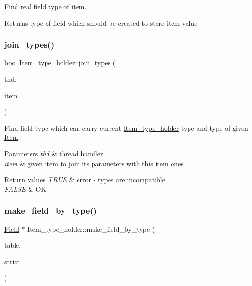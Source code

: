 Find real field type of item.

\begin{DoxyReturn}{Returns}
type of field which should be created to store item value 
\end{DoxyReturn}
\mbox{\label{classItem__type__holder_a7c3826305012a52cf704d39513e945b1}} 
\subsubsection{\texorpdfstring{join\+\_\+types()}{join\_types()}}
{\footnotesize\ttfamily bool Item\+\_\+type\+\_\+holder\+::join\+\_\+types (\begin{DoxyParamCaption}\item[{T\+HD $\ast$}]{thd,  }\item[{\mbox{\hyperlink{classItem}{Item}} $\ast$}]{item }\end{DoxyParamCaption})}

Find field type which can carry current \mbox{\hyperlink{classItem__type__holder}{Item\+\_\+type\+\_\+holder}} type and type of given \mbox{\hyperlink{classItem}{Item}}.


\begin{DoxyParams}{Parameters}
{\em thd} & thread handler \\
\hline
{\em item} & given item to join its parameters with this item ones\\
\hline
\end{DoxyParams}

\begin{DoxyRetVals}{Return values}
{\em T\+R\+UE} & error -\/ types are incompatible \\
\hline
{\em F\+A\+L\+SE} & OK \\
\hline
\end{DoxyRetVals}
\mbox{\label{classItem__type__holder_aa6892a6186fb7fc4552ec53e045fe47d}} 
\subsubsection{\texorpdfstring{make\+\_\+field\+\_\+by\+\_\+type()}{make\_field\_by\_type()}}
{\footnotesize\ttfamily \mbox{\hyperlink{classField}{Field}} $\ast$ Item\+\_\+type\+\_\+holder\+::make\+\_\+field\+\_\+by\+\_\+type (\begin{DoxyParamCaption}\item[{\mbox{\hyperlink{structTABLE}{T\+A\+B\+LE}} $\ast$}]{table,  }\item[{bool}]{strict }\end{DoxyParamCaption})}

